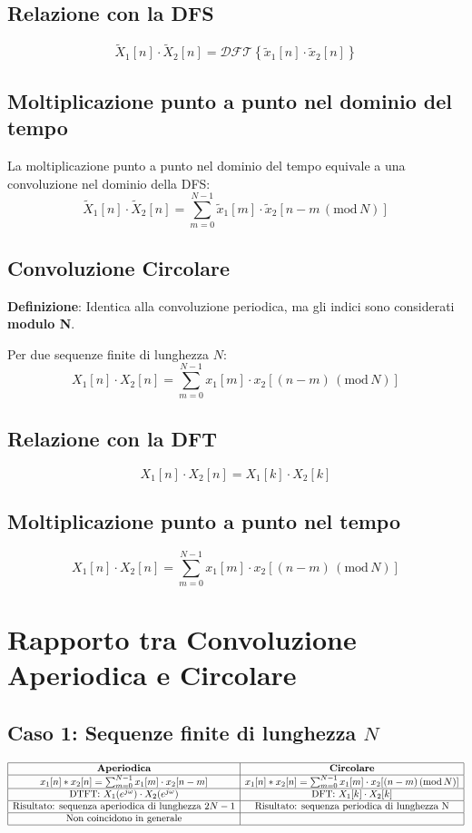 \subsection{Relazione con la DFS}
\[
\tilde{X}_1[n] \cdot \tilde{X}_2[n] = \mathcal{DFT}\left\{ \tilde{x}_1[n] \cdot \tilde{x}_2[n] \right\}
\]

\subsection{Moltiplicazione punto a punto nel dominio del tempo}
La moltiplicazione punto a punto nel dominio del tempo equivale a una convoluzione nel dominio della DFS:
\[
    \tilde{X}_1[n] \cdot \tilde{X}_2[n] = \sum_{m=0}^{N-1} \tilde{x}_1[m] \cdot \tilde{x}_2[n - m \, (\text{mod} \, N)]
\]

\subsection{Convoluzione Circolare}
\textbf{Definizione}: Identica alla convoluzione periodica, ma gli indici sono considerati \textbf{modulo N}.

Per due sequenze finite di lunghezza \( N \):
\[
    X_1[n] \cdot X_2[n] = \sum_{m=0}^{N-1} x_1[m] \cdot x_2[(n - m) \, (\text{mod} \, N)]
\]

\subsection{Relazione con la DFT}
\[
    X_1[n] \cdot X_2[n]= X_1[k] \cdot X_2[k]
\]

\subsection{Moltiplicazione punto a punto nel tempo}
\[
    X_1[n] \cdot X_2[n] = \sum_{m=0}^{N-1} x_1[m] \cdot x_2[(n - m) \, (\text{mod} \, N)]
\]

\section{Rapporto tra Convoluzione Aperiodica e Circolare}

\subsection*{Caso 1: Sequenze finite di lunghezza \( N \)}
\[
\begin{array}{|c|c|}
\hline
\textbf{Aperiodica} & \textbf{Circolare} \\
\hline
x_1[n] * x_2[n] = \sum_{m=0}^{N-1} x_1[m] \cdot x_2[n-m] & x_1[n] * x_2[n] = \sum_{m=0}^{N-1} x_1[m] \cdot x_2[(n - m) \, (\text{mod} \, N)] \\
\hline
\text{DTFT: } X_1(e^{j\omega}) \cdot X_2(e^{j\omega}) & \text{DFT: } X_1[k] \cdot X_2[k] \\
\hline
\text{Risultato: sequenza aperiodica di lunghezza } 2N-1 & \text{Risultato: sequenza periodica di lunghezza N} \\
\hline
\text{Non coincidono in generale} & \\
\hline
\end{array}
\]

